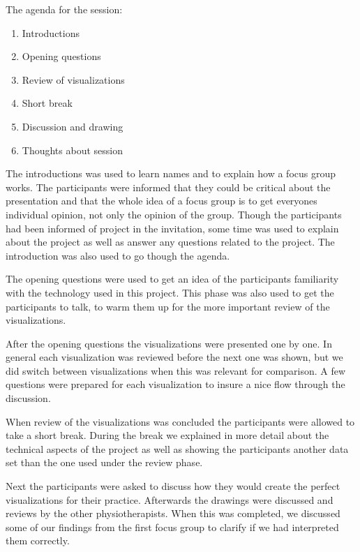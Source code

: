 The agenda for the session:
\vspace{-8mm}
\begin{enumerate}[itemsep=0cm, parsep=0cm]
  \item Introductions
  \item Opening questions
  \item Review of visualizations
  \item Short break
  \item Discussion and drawing
  \item Thoughts about session
\end{enumerate}

The introductions was used to learn names and to explain how a focus group works. The participants were informed that they could be critical about the presentation and that the whole idea of a focus group is to get everyones individual opinion, not only the opinion of the group. Though the participants had been informed of project in the invitation, some time was used to explain about the project as well as answer any questions related to the project. The introduction was also used to go though the agenda.

The opening questions were used to get an idea of the participants familiarity with the technology used in this project. This phase was also used to get the participants to talk, to warm them up for the more important review of the visualizations.

After the opening questions the visualizations were presented one by one. In general each visualization was reviewed before the next one was shown, but we did switch between visualizations when this was relevant for comparison. A few questions were prepared for each visualization to insure a nice flow through the discussion.

When review of the visualizations was concluded the participants were allowed to take a short break. During the break we explained in more detail about the technical aspects of the project as well as showing the participants another data set than the one used under the review phase. %

Next the participants were asked to discuss how they would create the perfect visualizations for their practice. Afterwards the drawings were discussed and reviews by the other physiotherapists. When this was completed, we discussed some of our findings from the first focus group to clarify if we had interpreted them correctly.

